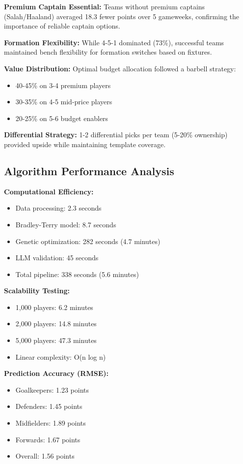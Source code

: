 \documentclass[10pt,a4paper,twocolumn]{article}
\begin{document}
\textbf{Premium Captain Essential:} Teams without premium captains (Salah/Haaland) averaged 18.3 fewer points over 5 gameweeks, confirming the importance of reliable captain options.

\textbf{Formation Flexibility:} While 4-5-1 dominated (73\%), successful teams maintained bench flexibility for formation switches based on fixtures.

\textbf{Value Distribution:} Optimal budget allocation followed a barbell strategy:
\begin{itemize}
\item 40-45\% on 3-4 premium players
\item 30-35\% on 4-5 mid-price players  
\item 20-25\% on 5-6 budget enablers
\end{itemize}

\textbf{Differential Strategy:} 1-2 differential picks per team (5-20\% ownership) provided upside while maintaining template coverage.

\subsection*{Algorithm Performance Analysis}

\textbf{Computational Efficiency:}
\begin{itemize}
\item Data processing: 2.3 seconds
\item Bradley-Terry model: 8.7 seconds
\item Genetic optimization: 282 seconds (4.7 minutes)
\item LLM validation: 45 seconds
\item Total pipeline: 338 seconds (5.6 minutes)
\end{itemize}

\textbf{Scalability Testing:}
\begin{itemize}
\item 1,000 players: 6.2 minutes
\item 2,000 players: 14.8 minutes  
\item 5,000 players: 47.3 minutes
\item Linear complexity: O(n log n)
\end{itemize}

\textbf{Prediction Accuracy (RMSE):}
\begin{itemize}
\item Goalkeepers: 1.23 points
\item Defenders: 1.45 points
\item Midfielders: 1.89 points
\item Forwards: 1.67 points
\item Overall: 1.56 points
\end{itemize}
\end{document}

